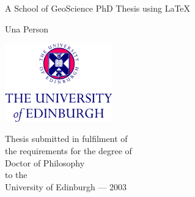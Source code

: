 

\thispagestyle{empty}

\begin{minipage}{\textwidth}
\end{minipage}
\begin{center}
\vspace{2cm}
{ \Huge A School of GeoScience PhD Thesis using {\LaTeX} 
  \par
  \vspace{0.5cm} 
{\Large Una Person \par}
}
\end{center}
\vfill
\begin{center}
\vspace{6cm}    
\centerline{\includegraphics[width=0.35\textwidth]{../preface/2Line2ColCMYK_CS3.pdf}}
\vspace{0.5cm}
Thesis submitted in fulfilment of\\
the requirements for the degree of\\ 
Doctor of Philosophy\\ 
to the\\
University of Edinburgh --- 2003
\end{center}

\newpage
\thispagestyle{empty}


